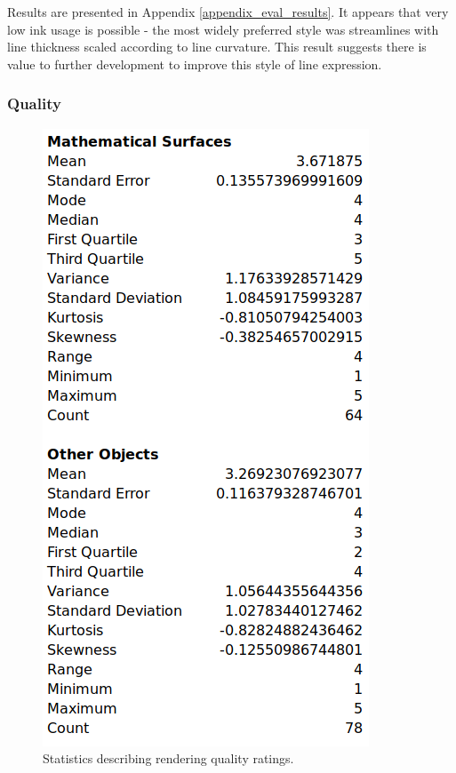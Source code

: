 Results are presented in Appendix \ref{appendix_eval_results}. It appears that very low ink usage is possible - the most widely preferred style was streamlines with line thickness scaled according to line curvature.
This result suggests there is value to further development to improve this style of line expression.

\FloatBarrier
\subsubsection{Quality}

\begin{figure}
  \begin{center}
    \includegraphics[scale=0.3]{images/eval_quality_results.png}
  \end{center}
  \caption{Statistics describing rendering quality ratings.}\label{eval_quality_results}
\end{figure}

